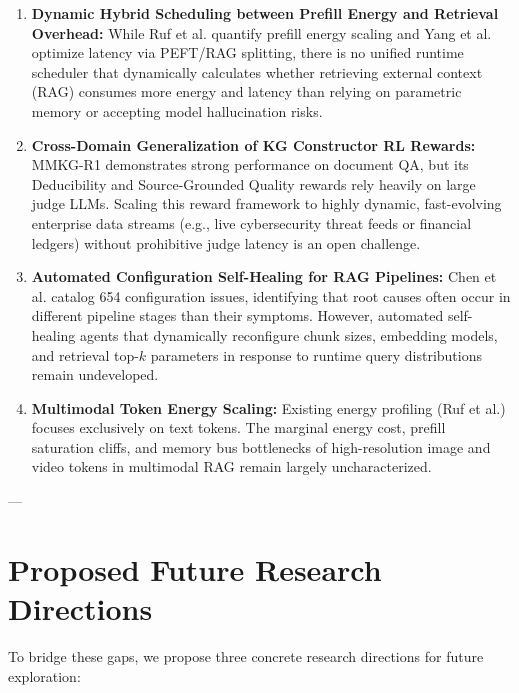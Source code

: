 \documentclass[10pt,journal,compsoc]{IEEEtran}
\begin{document}
\begin{enumerate}
    \item \textbf{Dynamic Hybrid Scheduling between Prefill Energy and Retrieval Overhead:} While Ruf et al. quantify prefill energy scaling and Yang et al. optimize latency via PEFT/RAG splitting, there is no unified runtime scheduler that dynamically calculates whether retrieving external context (RAG) consumes more energy and latency than relying on parametric memory or accepting model hallucination risks.
    \item \textbf{Cross-Domain Generalization of KG Constructor RL Rewards:} MMKG-R1 demonstrates strong performance on document QA, but its Deducibility and Source-Grounded Quality rewards rely heavily on large judge LLMs. Scaling this reward framework to highly dynamic, fast-evolving enterprise data streams (e.g., live cybersecurity threat feeds or financial ledgers) without prohibitive judge latency is an open challenge.
    \item \textbf{Automated Configuration Self-Healing for RAG Pipelines:} Chen et al. catalog 654 configuration issues, identifying that root causes often occur in different pipeline stages than their symptoms. However, automated self-healing agents that dynamically reconfigure chunk sizes, embedding models, and retrieval top-$k$ parameters in response to runtime query distributions remain undeveloped.
    \item \textbf{Multimodal Token Energy Scaling:} Existing energy profiling (Ruf et al.) focuses exclusively on text tokens. The marginal energy cost, prefill saturation cliffs, and memory bus bottlenecks of high-resolution image and video tokens in multimodal RAG remain largely uncharacterized.
\end{enumerate}

---

\section{Proposed Future Research Directions}

To bridge these gaps, we propose three concrete research directions for future exploration:
\end{document}
